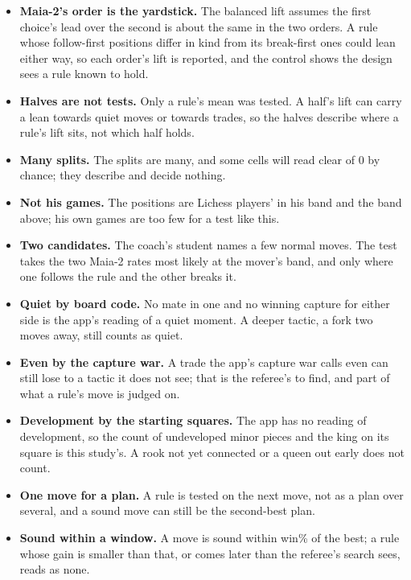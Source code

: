 \documentclass[11pt]{article}
\begin{document}
\begin{itemize}[nosep]
\item \textbf{Maia-2's order is the yardstick.} The balanced lift assumes the first choice's lead
  over the second is about the same in the two orders. A rule whose follow-first positions differ
  in kind from its break-first ones could lean either way, so each order's lift is reported, and
  the control shows the design sees a rule known to hold.
\item \textbf{Halves are not tests.} Only a rule's mean was tested. A half's lift can carry a lean
  towards quiet moves or towards trades, so the halves describe where a rule's lift sits, not which
  half holds.
\item \textbf{Many splits.} The splits are many, and some cells will read clear of 0 by chance; they
  describe and decide nothing.
\item \textbf{Not his games.} The positions are Lichess players' in his band and the band above;
  his own games are too few for a test like this.
\item \textbf{Two candidates.} The coach's student names a few normal moves. The test takes the
  two Maia-2 rates most likely at the mover's band, and only where one follows the rule and the
  other breaks it.
\item \textbf{Quiet by board code.} No mate in one and no winning capture for either side is the
  app's reading of a quiet moment. A deeper tactic, a fork two moves away, still counts as quiet.
\item \textbf{Even by the capture war.} A trade the app's capture war calls even can still lose to a
  tactic it does not see; that is the referee's to find, and part of what a rule's move is judged on.
\item \textbf{Development by the starting squares.} The app has no reading of development, so the
  count of undeveloped minor pieces and the king on its square is this study's. A rook not yet
  connected or a queen out early does not count.
\item \textbf{One move for a plan.} A rule is tested on the next move, not as a plan over several,
  and a sound move can still be the second-best plan.
\item \textbf{Sound within a window.} A move is sound within \WindowWp{} win\% of the best; a rule
  whose gain is smaller than that, or comes later than the referee's search sees, reads as none.
\end{itemize}
\end{document}
